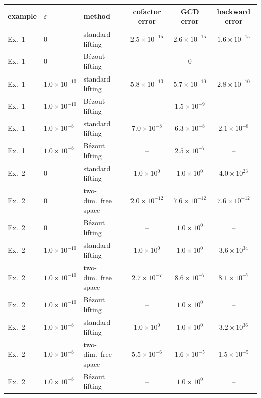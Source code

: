 \begin{tabular}{lllccc}\hline
example & $\varepsilon$ & method & cofactor error & GCD error & backward error\\ \hline
Ex.~1 & $0$ & standard lifting & $2.5\times 10^{-15}$ & $2.6\times 10^{-15}$ & $1.6\times 10^{-15}$\\
Ex.~1 & $0$ & B\'ezout lifting~\cite{sanuki09} & -- & $0$ & --\\
Ex.~1 & $1.0\times 10^{-10}$ & standard lifting & $5.8\times 10^{-10}$ & $5.7\times 10^{-10}$ & $2.8\times 10^{-10}$\\
Ex.~1 & $1.0\times 10^{-10}$ & B\'ezout lifting~\cite{sanuki09} & -- & $1.5\times 10^{-9}$ & --\\
Ex.~1 & $1.0\times 10^{-8}$ & standard lifting & $7.0\times 10^{-8}$ & $6.3\times 10^{-8}$ & $2.1\times 10^{-8}$\\
Ex.~1 & $1.0\times 10^{-8}$ & B\'ezout lifting~\cite{sanuki09} & -- & $2.5\times 10^{-7}$ & --\\
\hline
Ex.~2 & $0$ & standard lifting & $1.0\times 10^{0}$ & $1.0\times 10^{0}$ & $4.0\times 10^{23}$\\
Ex.~2 & $0$ & two-dim.\ free space & $2.0\times 10^{-12}$ & $7.6\times 10^{-12}$ & $7.6\times 10^{-12}$\\
Ex.~2 & $0$ & B\'ezout lifting~\cite{sanuki09} & -- & $1.0\times 10^{0}$ & --\\
Ex.~2 & $1.0\times 10^{-10}$ & standard lifting & $1.0\times 10^{0}$ & $1.0\times 10^{0}$ & $3.6\times 10^{34}$\\
Ex.~2 & $1.0\times 10^{-10}$ & two-dim.\ free space & $2.7\times 10^{-7}$ & $8.6\times 10^{-7}$ & $8.1\times 10^{-7}$\\
Ex.~2 & $1.0\times 10^{-10}$ & B\'ezout lifting~\cite{sanuki09} & -- & $1.0\times 10^{0}$ & --\\
Ex.~2 & $1.0\times 10^{-8}$ & standard lifting & $1.0\times 10^{0}$ & $1.0\times 10^{0}$ & $3.2\times 10^{36}$\\
Ex.~2 & $1.0\times 10^{-8}$ & two-dim.\ free space & $5.5\times 10^{-6}$ & $1.6\times 10^{-5}$ & $1.5\times 10^{-5}$\\
Ex.~2 & $1.0\times 10^{-8}$ & B\'ezout lifting~\cite{sanuki09} & -- & $1.0\times 10^{0}$ & --\\
\hline
\end{tabular}\\[2pt]

